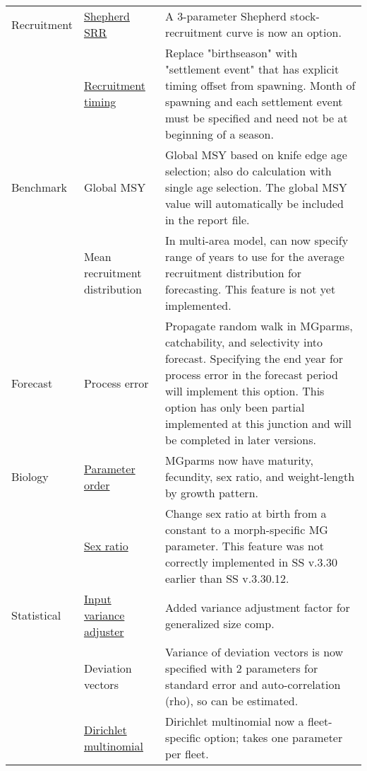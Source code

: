 \begin{center}
{\begin{longtable}{p{2cm} p{3cm} p{10cm}}
		Recruitment
			& \hyperlink{Shepherd}{Shepherd SRR} & 
				A 3-parameter Shepherd stock-recruitment curve is now an option.\\
			& \hyperlink{RecrTiming}{Recruitment timing} & 
				Replace "birthseason" with "settlement event" that has explicit timing offset from spawning.  Month of spawning and each settlement event must be specified and need not be at beginning of a season.\\

		Benchmark 
			& Global MSY &  
				Global MSY based on knife edge age selection; also do calculation with single age selection. The global MSY value will automatically be included in the report file.\\
		
			& Mean recruitment distribution & 
				In multi-area model, can now specify range of years to use for the average recruitment distribution for forecasting. This feature is not yet implemented. \\

		Forecast & 
			Process error & 
				Propagate random walk in MGparms, catchability, and selectivity into forecast. Specifying the end year for process error in the forecast period will implement this option.  This option has only been partial implemented at this junction and will be completed in later versions.\\

		Biology 
			& \hyperlink{MGorder}{Parameter order} & 
				MGparms now have maturity, fecundity, sex ratio, and weight-length by growth pattern.\\
				
		    & \hyperlink{SexRatio}{Sex ratio} & 
			    Change sex ratio at birth from a constant to a morph-specific MG parameter. This feature was not correctly implemented in SS v.3.30 earlier than SS v.3.30.12. \\

		Statistical 
			& \hyperlink{GcompVar}{Input variance adjuster} & 
				Added variance adjustment factor for generalized size comp. \\
			
			& Deviation vectors & 
				Variance of deviation vectors is now specified with 2 parameters for standard error and auto-correlation (rho), so can be estimated.\\
				
			& \hyperlink{Dirichlet}{Dirichlet multinomial} & 
				Dirichlet multinomial now a fleet-specific option; takes one parameter per fleet. \\


\end{longtable}}
\end{center}
